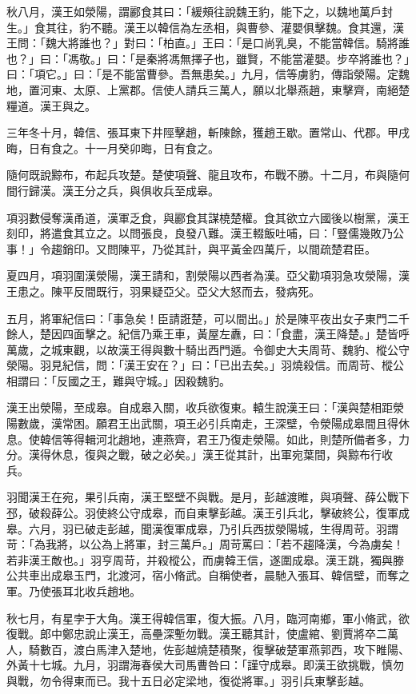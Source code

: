 \begin{pinyinscope}
秋八月，漢王如滎陽，謂酈食其曰：「緩頰往說魏王豹，能下之，以魏地萬戶封生。」食其往，豹不聽。漢王以韓信為左丞相，與曹參、灌嬰俱擊魏。食其還，漢王問：「魏大將誰也？」對曰：「柏直。」王曰：「是口尚乳臭，不能當韓信。騎將誰也？」曰：「馮敬。」曰：「是秦將馮無擇子也，雖賢，不能當灌嬰。步卒將誰也？」曰：「項它。」曰：「是不能當曹參。吾無患矣。」九月，信等虜豹，傳詣滎陽。定魏地，置河東、太原、上黨郡。信使人請兵三萬人，願以北舉燕趙，東擊齊，南絕楚糧道。漢王與之。

三年冬十月，韓信、張耳東下井陘擊趙，斬陳餘，獲趙王歇。置常山、代郡。甲戌晦，日有食之。十一月癸卯晦，日有食之。

隨何既說黥布，布起兵攻楚。楚使項聲、龍且攻布，布戰不勝。十二月，布與隨何間行歸漢。漢王分之兵，與俱收兵至成皋。

項羽數侵奪漢甬道，漢軍乏食，與酈食其謀橈楚權。食其欲立六國後以樹黨，漢王刻印，將遣食其立之。以問張良，良發八難。漢王輟飯吐哺，曰：「豎儒幾敗乃公事！」令趨銷印。又問陳平，乃從其計，與平黃金四萬斤，以間疏楚君臣。

夏四月，項羽圍漢滎陽，漢王請和，割滎陽以西者為漢。亞父勸項羽急攻滎陽，漢王患之。陳平反間既行，羽果疑亞父。亞父大怒而去，發病死。

五月，將軍紀信曰：「事急矣！臣請誑楚，可以間出。」於是陳平夜出女子東門二千餘人，楚因四面擊之。紀信乃乘王車，黃屋左纛，曰：「食盡，漢王降楚。」楚皆呼萬歲，之城東觀，以故漢王得與數十騎出西門遁。令御史大夫周苛、魏豹、樅公守滎陽。羽見紀信，問：「漢王安在？」曰：「已出去矣。」羽燒殺信。而周苛、樅公相謂曰：「反國之王，難與守城。」因殺魏豹。

漢王出滎陽，至成皋。自成皋入關，收兵欲復東。轅生說漢王曰：「漢與楚相距滎陽數歲，漢常困。願君王出武關，項王必引兵南走，王深壁，令滎陽成皋間且得休息。使韓信等得輯河北趙地，連燕齊，君王乃復走滎陽。如此，則楚所備者多，力分。漢得休息，復與之戰，破之必矣。」漢王從其計，出軍宛葉間，與黥布行收兵。

羽聞漢王在宛，果引兵南，漢王堅壁不與戰。是月，彭越渡睢，與項聲、薛公戰下邳，破殺薛公。羽使終公守成皋，而自東擊彭越。漢王引兵北，擊破終公，復軍成皋。六月，羽已破走彭越，聞漢復軍成皋，乃引兵西拔滎陽城，生得周苛。羽謂苛：「為我將，以公為上將軍，封三萬戶。」周苛罵曰：「若不趨降漢，今為虜矣！若非漢王敵也。」羽亨周苛，并殺樅公，而虜韓王信，遂圍成皋。漢王跳，獨與滕公共車出成皋玉門，北渡河，宿小脩武。自稱使者，晨馳入張耳、韓信壁，而奪之軍。乃使張耳北收兵趙地。

秋七月，有星孛于大角。漢王得韓信軍，復大振。八月，臨河南鄉，軍小脩武，欲復戰。郎中鄭忠說止漢王，高壘深塹勿戰。漢王聽其計，使盧綰、劉賈將卒二萬人，騎數百，渡白馬津入楚地，佐彭越燒楚積聚，復擊破楚軍燕郭西，攻下睢陽、外黃十七城。九月，羽謂海春侯大司馬曹咎曰：「謹守成皋。即漢王欲挑戰，慎勿與戰，勿令得東而已。我十五日必定梁地，復從將軍。」羽引兵東擊彭越。


\end{pinyinscope}
